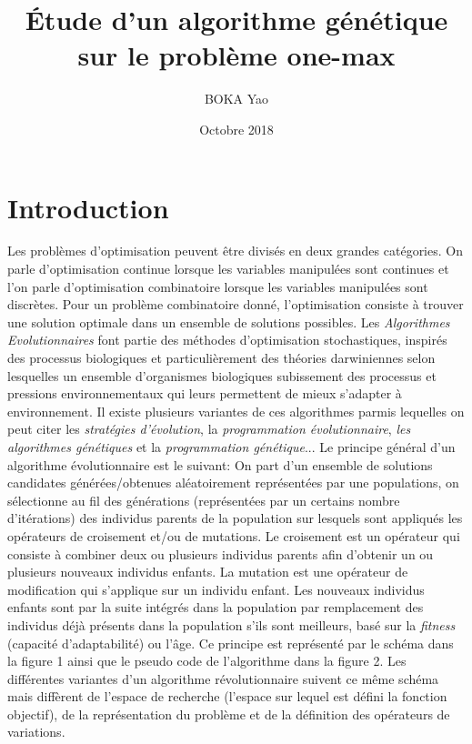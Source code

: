 \documentclass{article}
\title{Étude d'un algorithme génétique sur le problème one-max}
\author{BOKA Yao }
\date{Octobre 2018}
\begin{document}
\maketitle

\section{Introduction}

Les problèmes d'optimisation peuvent être divisés en deux grandes catégories. On parle d'optimisation continue lorsque les variables manipulées sont continues et l'on parle d'optimisation combinatoire lorsque les variables manipulées sont discrètes.
Pour un problème combinatoire donné, l'optimisation consiste à trouver une solution optimale dans un  ensemble de solutions possibles.
Les \emph{Algorithmes Evolutionnaires} font partie des méthodes d'optimisation stochastiques, inspirés des processus biologiques et particulièrement des théories darwiniennes  selon lesquelles un ensemble d'organismes biologiques subissement des processus et pressions environnementaux qui leurs permettent de mieux s'adapter à environnement. Il existe plusieurs variantes de ces algorithmes parmis lequelles on peut citer les \emph{stratégies d'évolution}, la \emph{programmation évolutionnaire}, \emph{les algorithmes génétiques} et la \emph{programmation génétique}...
Le principe général d'un algorithme évolutionnaire est le suivant: On part d'un ensemble de solutions candidates générées/obtenues aléatoirement représentées par une populations, on sélectionne au fil des générations (représentées par un certains nombre d'itérations) des individus parents de la population sur lesquels sont appliqués les opérateurs de croisement et/ou de mutations. Le croisement est un opérateur qui consiste à combiner deux ou plusieurs individus parents afin d'obtenir un ou plusieurs nouveaux individus enfants. La mutation est une opérateur de modification qui s'applique sur un individu enfant. Les nouveaux individus enfants sont par la suite intégrés dans la population par remplacement des individus déjà présents dans la population s'ils sont meilleurs, basé sur la \emph{fitness} (capacité d'adaptabilité) ou l'âge.  Ce principe est représenté par le schéma dans la figure 1 ainsi que le pseudo code de l'algorithme dans la figure 2.
Les différentes variantes d'un algorithme révolutionnaire suivent ce même schéma mais diffèrent de l'espace de recherche (l'espace sur lequel est défini la fonction objectif), de la représentation du problème et de la définition des opérateurs de variations.
\end{document}
